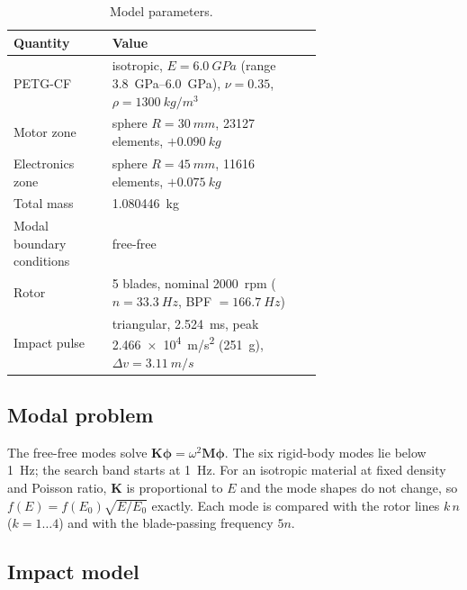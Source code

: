 \documentclass[11pt]{article}
\begin{document}
\begin{table}[h]
\centering
\caption{Model parameters.}
\label{tab:model}
\small
\begin{tabular}{lp{0.68\linewidth}}
\toprule
Quantity & Value \\
\midrule
PETG-CF & isotropic, $E=\SI{6.0}{GPa}$ (range \SIrange{3.8}{6.0}{GPa}), $\nu=0.35$, $\rho=\SI{1300}{kg/m^3}$ \\
Motor zone & sphere $R=\SI{30}{mm}$, \num{23127} elements, $+\SI{0.090}{kg}$ \\
Electronics zone & sphere $R=\SI{45}{mm}$, \num{11616} elements, $+\SI{0.075}{kg}$ \\
Total mass & \SI{1.080446}{kg} \\
Modal boundary conditions & free-free \\
Rotor & 5 blades, nominal \SI{2000}{rpm} ($n=\SI{33.3}{Hz}$, BPF $=\SI{166.7}{Hz}$) \\
Impact pulse & triangular, \SI{2.524}{ms}, peak \SI{2.466e4}{m/s^2} (\SI{251}{g}), $\Delta v=\SI{3.11}{m/s}$ \\
\bottomrule
\end{tabular}
\end{table}

\subsection{Modal problem}

The free-free modes solve $\mathbf{K}\boldsymbol{\phi}=\omega^2\mathbf{M}\boldsymbol{\phi}$. The six rigid-body modes lie
below \SI{1}{Hz}; the search band starts at \SI{1}{Hz}. For an isotropic material at fixed density and Poisson ratio,
$\mathbf{K}$ is proportional to $E$ and the mode shapes do not change, so $f(E)=f(E_0)\sqrt{E/E_0}$ exactly. Each
mode is compared with the rotor lines $k\,n$ ($k=1\dots4$) and with the blade-passing frequency $5n$.

\subsection{Impact model}
\end{document}
